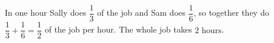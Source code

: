In one hour Sally does $\dfrac13$ of the job and Sam does $\dfrac16$, so together they do $\dfrac13+\dfrac16=\dfrac12$ of the job per hour. The whole job takes $\boxed{2\text{ hours}}$.
